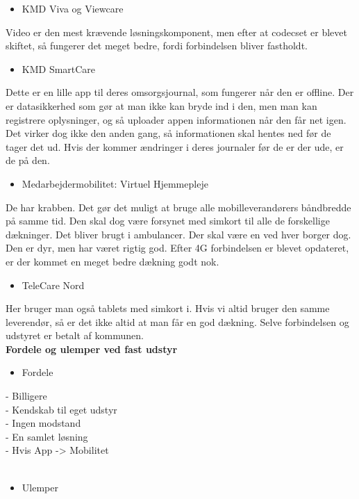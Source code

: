 \begin{itemize}
\item KMD Viva og Viewcare
\end{itemize}
Video er den mest krævende løsningskomponent, men efter at codecset er blevet skiftet, så fungerer det meget bedre, fordi forbindelsen bliver fastholdt.\\ 
\begin{itemize}
\item KMD SmartCare
\end{itemize}
Dette er en lille app til deres omsorgsjournal, som fungerer når den er offline. Der er datasikkerhed som gør at man ikke kan bryde ind i den, men man kan registrere oplysninger, og så uploader appen informationen når den får net igen. Det virker dog ikke den anden gang, så informationen skal hentes ned før de tager det ud. Hvis der kommer ændringer i deres journaler før de er der ude, er de på den.\\
\begin{itemize}
\item Medarbejdermobilitet: Virtuel Hjemmepleje
\end{itemize}
De har krabben. Det gør det muligt at bruge alle mobilleverandørers båndbredde på samme tid. Den skal dog være forsynet med simkort til alle de forskellige dækninger. Det bliver brugt i ambulancer. Der skal være en ved hver borger dog. Den er dyr, men har været rigtig god. Efter 4G forbindelsen er blevet opdateret, er der kommet en meget bedre dækning godt nok. \\
\begin{itemize}
\item TeleCare Nord
\end{itemize}
Her bruger man også tablets med simkort i. Hvis vi altid bruger den samme leverendør, så er det ikke altid at man får en god dækning. Selve forbindelsen og udstyret er betalt af kommunen.\\
\textbf{Fordele og ulemper ved fast udstyr}\\
\begin{itemize}
\item Fordele
\end{itemize}
- Billigere\\
- Kendskab til eget udstyr\\
- Ingen modstand\\
- En samlet løsning\\ 
- Hvis App -> Mobilitet\\
\\
\begin{itemize}
\item Ulemper
\end{itemize}
